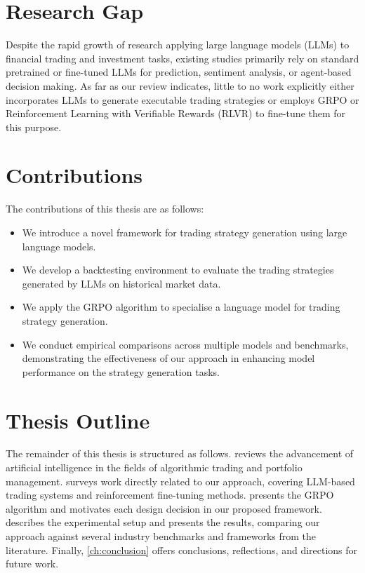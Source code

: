 \documentclass[12pt, a4paper]{report}
\begin{document}
\section{Research Gap}
\label{sec:gap}

Despite the rapid growth of research applying large language models (LLMs) to financial trading
and investment tasks, existing studies primarily rely on standard pretrained or fine-tuned LLMs
for prediction, sentiment analysis, or agent-based decision making. As far as our review
indicates, little to no work explicitly either incorporates LLMs to generate executable trading strategies or employs GRPO or Reinforcement Learning with Verifiable Rewards (RLVR) to fine-tune them for this purpose.

\section{Contributions}
\label{sec:contributions}

The contributions of this thesis are as follows:

\begin{itemize}
  \item We introduce a novel framework for trading strategy generation using large language models.
  \item We develop a backtesting environment to evaluate the trading strategies generated by LLMs on historical market data.
  \item We apply the GRPO algorithm to specialise a language
        model for trading strategy generation.
  \item We conduct empirical comparisons across multiple models and benchmarks, demonstrating the effectiveness of our
        approach in enhancing model performance on the strategy generation tasks.     
  \end{itemize}

\section{Thesis Outline}
\label{sec:outline}

The remainder of this thesis is structured as follows.
 reviews the advancement of artificial intelligence in the fields of
algorithmic trading and portfolio management.
 surveys work directly related to our approach, covering LLM-based trading
systems and reinforcement fine-tuning methods.
 presents the GRPO algorithm and motivates each design decision in our
proposed framework.
 describes the experimental setup and presents the results, comparing our approach against several industry
benchmarks and frameworks from the literature.
Finally, \cref{ch:conclusion} offers conclusions, reflections, and directions for future work.
\end{document}
